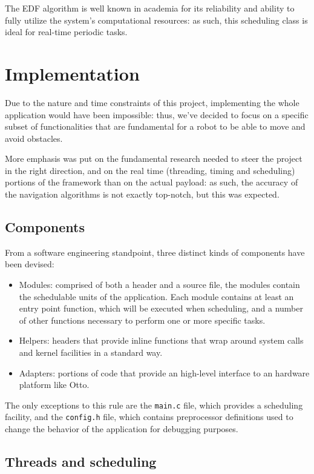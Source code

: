 \documentclass[a4paper,12pt]{report}
\begin{document}
The EDF algorithm is well known in academia for its reliability and ability to fully utilize the system's computational resources: as such, this scheduling class is ideal for real-time periodic tasks.

\section{Implementation}

Due to the nature and time constraints of this project, implementing the whole application would have been impossible: thus, we've decided to focus on a specific subset of functionalities that are fundamental for a robot to be able to move and avoid obstacles. 

More emphasis was put on the fundamental research needed to steer the project in the right direction, and on the real time (threading, timing and scheduling) portions of the framework than on the actual payload: as such, the accuracy of the navigation algorithms is not exactly top-notch, but this was expected.

\subsection{Components}

From a software engineering standpoint, three distinct kinds of components have been devised:
\begin{itemize}
    \item Modules: comprised of both a header and a source file, the modules contain the schedulable units of the application. Each module contains at least an entry point function, which will be executed when scheduling, and a number of other functions necessary to perform one or more specific tasks.   
    \item Helpers: headers that provide inline functions that wrap around system calls and kernel facilities in a standard way.
    \item Adapters: portions of code that provide an high-level interface to an hardware platform like Otto.
\end{itemize}

The only exceptions to this rule are the \texttt{main.c} file, which provides a scheduling facility, and the \texttt{config.h} file, which contains preprocessor definitions used to change the behavior of the application for debugging purposes.

\subsection{Threads and scheduling}
\end{document}
